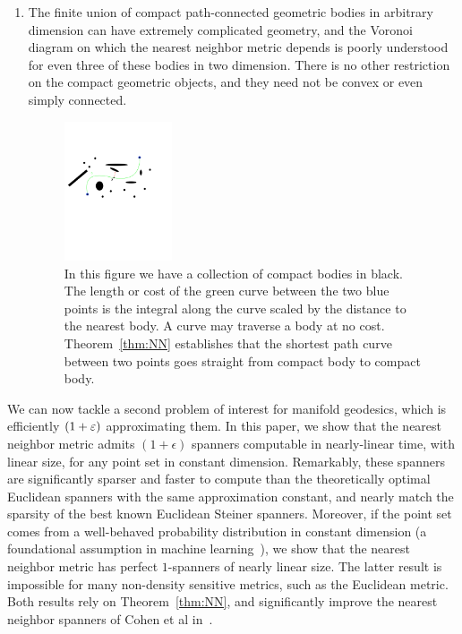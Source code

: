 \begin{enumerate}
 \item The finite union of compact path-connected geometric bodies in arbitrary
 dimension can have extremely complicated geometry, and the Voronoi diagram
on which the nearest neighbor metric depends is poorly understood for even
three of these bodies in two dimension.  There is no other restriction on
the compact geometric objects, and they need not be convex or even simply
connected. 
\begin{figure}[htbp]
  \centering
    \includegraphics[width=0.3\textwidth]{Figures/example1.pdf}
    \caption{In this figure we have a collection of compact bodies in black.
      The length or cost of the green curve between the two blue points
      is the integral along the curve scaled by the distance to the nearest body.
    A curve may traverse a body at  no cost. Theorem~\ref{thm:NN}
establishes that the shortest path curve between two points goes straight
from compact body to compact body.}
  \label{fig:example1}
\end{figure}
\end{enumerate}

We can now tackle a second problem of interest for manifold geodesics,
which is efficiently $(1+\varepsilon)$ approximating them. In this paper, we show
that the nearest neighbor metric admits $(1+\epsilon)$ spanners computable
in nearly-linear time, with linear size, for any point set in constant
dimension. Remarkably, these spanners are significantly sparser and faster
to compute than the theoretically optimal Euclidean spanners with the same
approximation constant, and nearly match the sparsity of the best known
Euclidean Steiner spanners. Moreover, if the point set comes from a
well-behaved probability distribution in constant dimension (a foundational
assumption in machine learning~\cite{hwang2016}), we show that the nearest neighbor
metric has perfect $1$-spanners of nearly linear size. The latter result is
impossible for many non-density sensitive metrics, such as the Euclidean
metric. Both results rely on Theorem~\ref{thm:NN}, and significantly
improve the nearest neighbor spanners of Cohen et al in~\cite{cohen15approximating}.

